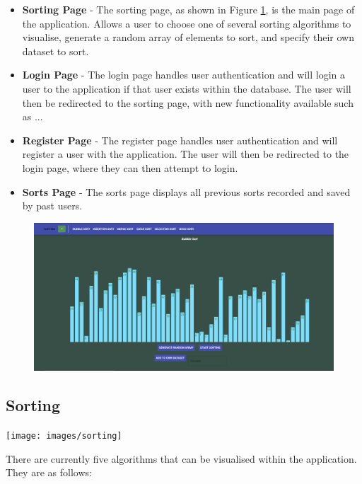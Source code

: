 \begin{itemize}
    \item \textbf{Sorting Page} - The sorting page, as shown in Figure \ref{fig:main_page}, is the main page of the application. Allows a user to choose one of several sorting algorithms to visualise, generate a random array of elements to sort, and specify their own dataset to sort.
    \item \textbf{Login Page} - The login page handles user authentication and will login a user to the application if that user exists within the database. The user will then be redirected to the sorting page, with new functionality available such as ...
    \item \textbf{Register Page} - The register page handles user authentication and will register a user with the application. The user will then be redirected to the login page, where they can then attempt to login.
    \item \textbf{Sorts Page} - The sorts page displays all previous sorts recorded and saved by past users.
\end{itemize}

\begin{figure}[!h]
    \centering
    \includegraphics[scale=.4]{images/web_app_main}
    \label{fig:main_page}
\end{figure}

\subsection{Sorting}
\begin{center}
    \texttt{[image: images/sorting]}
    \label{fig:main_page}
\end{center}

There are currently five algorithms that can be visualised within the application. They are as follows:

